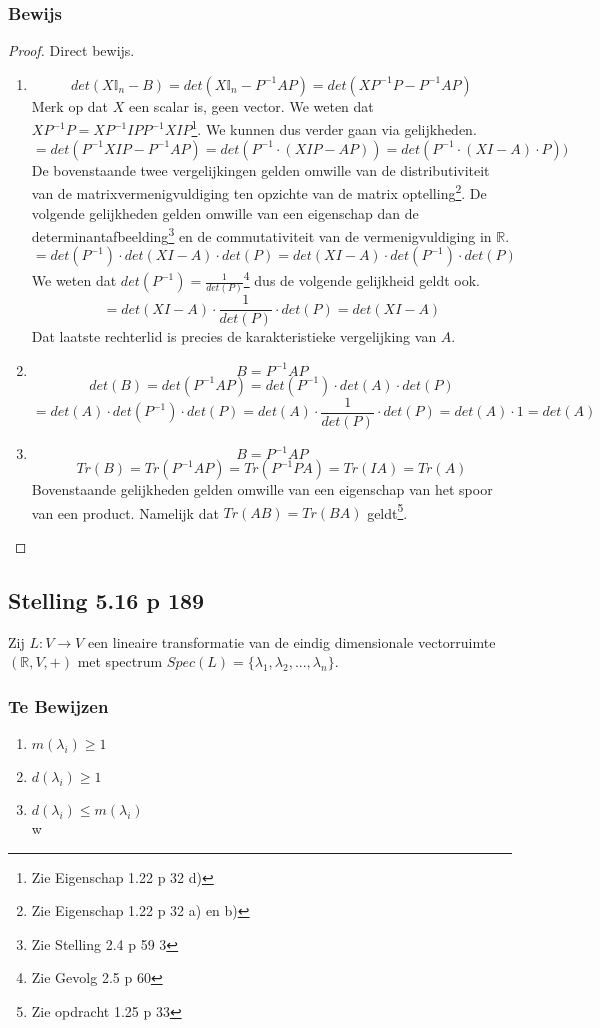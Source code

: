 \documentclass[lineaire_algebra_oplossingen.tex]{subfiles}
\begin{document}
\subsubsection*{Bewijs}
\begin{proof}
Direct bewijs.
\begin{enumerate}
\item 
\[
det(X\mathbb{I}_n - B) = det(X\mathbb{I}_n - P^{-1}AP) = det(XP^{-1}P - P^{-1}AP)
\]
Merk op dat $X$ een scalar is, geen vector.
We weten dat $XP^{-1}P = XP^{-1}IP P^{-1}XIP$\footnote{Zie Eigenschap 1.22 p 32 d)}. We kunnen dus verder gaan via gelijkheden.
\[
= det(P^{-1} XI P - P^{-1}AP) = det(P^{-1}\cdot ( XI P - AP)) = det(P^{-1}\cdot ( XI- A) \cdot P))
\]
De bovenstaande twee vergelijkingen gelden omwille van de distributiviteit van de matrixvermenigvuldiging ten opzichte van de matrix optelling\footnote{Zie Eigenschap 1.22 p 32 a) en b)}. De volgende gelijkheden gelden omwille van een eigenschap dan de determinantafbeelding\footnote{Zie Stelling 2.4 p 59 3} en de commutativiteit van de vermenigvuldiging in $\mathbb{R}$.
\[
=det(P^{-1})\cdot det( XI- A)\cdot det(P) =det( XI- A)\cdot det(P^{-1}) \cdot det(P)
\]
We weten dat $det( P^{-1}) = \frac{1}{det(P)}$\footnote{Zie Gevolg 2.5 p 60} dus de volgende gelijkheid geldt ook.
\[
=det( XI- A)\cdot \frac{1}{det(P)}\cdot det(P) = det( XI- A)
\]
Dat laatste rechterlid is precies de karakteristieke vergelijking van $A$.

\item
\[
B = P^{-1}AP
\]
\[
det(B) = det(P^{-1}AP) = det(P^{-1})\cdot det(A)\cdot det(P)
\]
\[
= det(A)\cdot det(P^{-1})\cdot det(P) = det(A)\cdot \frac{1}{det(P)}\cdot det(P) = det(A) \cdot 1 = det(A)
\]

\item
\[
B = P^{-1}AP 
\]
\[
Tr(B) = Tr(P^{-1}A P) = Tr(P^{-1}P A) = Tr(IA) = Tr(A)
\]
Bovenstaande gelijkheden gelden omwille van een eigenschap van het spoor van een product. Namelijk dat $Tr(AB) = Tr(BA)$ geldt\footnote{Zie opdracht 1.25 p 33}.
\end{enumerate}
\end{proof}

\subsection{Stelling 5.16 p 189}
Zij $L:V\rightarrow V$ een lineaire transformatie van de eindig dimensionale vectorruimte $(\mathbb{R},V,+)$ met spectrum $Spec(L) = \{\lambda_1,\lambda_2,...,\lambda_n\}$.
\subsubsection*{Te Bewijzen}
\begin{enumerate}
\item $m(\lambda_i) \ge 1$\\
\item $d(\lambda_i) \ge 1$\\
\item $d(\lambda_i) \le m(\lambda_i)$\\w
\end{enumerate}
\end{document}
